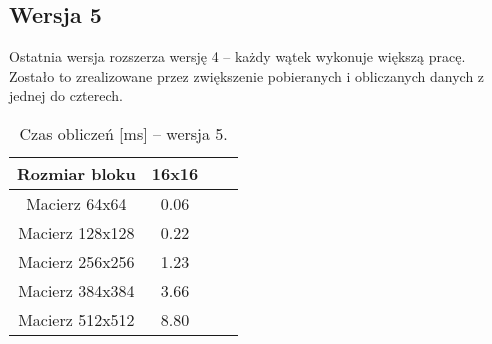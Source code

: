 
\subsection{Wersja 5}

Ostatnia wersja rozszerza wersję 4 -- każdy wątek wykonuje większą pracę. Zostało to zrealizowane przez zwiększenie pobieranych i obliczanych danych z jednej do czterech.



\begin{table}[H]
\centering
\begin{tabular}{|c|c|c|c|}
\hline
Rozmiar bloku & 16x16 \\ \hline
Macierz 64x64 & 0.06 \\ \hline
Macierz 128x128 & 0.22 \\ \hline
Macierz 256x256 & 1.23 \\ \hline
Macierz 384x384 & 3.66 \\ \hline
Macierz 512x512 & 8.80 \\ \hline
\end{tabular}
\caption{Czas obliczeń [ms] -- wersja 5.}
\end{table}
